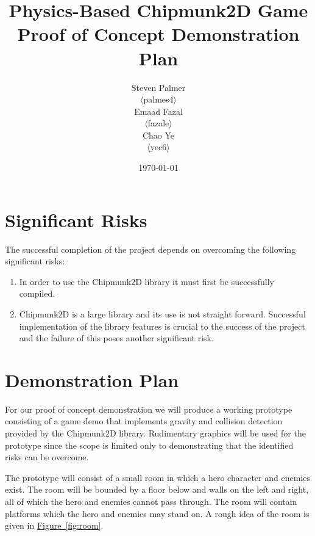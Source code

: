 \documentclass[12pt, titlepage]{article}
\begin{document}
\title{\bf Physics-Based Chipmunk2D Game\\[\baselineskip]\Large Proof of Concept Demonstration Plan}
\author{Steven Palmer\\$\langle$palmes4$\rangle$\\Emaad Fazal\\$\langle$fazale$\rangle$\\Chao Ye\\$\langle$yec6$\rangle$}
\date{\today}
	
\maketitle

\section*{Significant Risks}
The successful completion of the project depends on overcoming the following significant risks:
\begin{enumerate}
  \item In order to use the Chipmunk2D library it must first be successfully compiled.
  \item Chipmunk2D is a large library and its use is not straight forward.  Successful implementation of the library features is crucial to the success of the project and the failure of this poses another significant risk.
\end{enumerate}


\section*{Demonstration Plan}

For our proof of concept demonstration we will produce a working prototype consisting of a game demo that implements gravity and collision detection provided by the Chipmunk2D library.  Rudimentary graphics will be used for the prototype since the scope is limited only to demonstrating that the identified risks can be overcome.

The prototype will consist of a small room in which a hero character and enemies exist.  The room will be bounded by a floor below and walls on the left and right, all of which the hero and enemies cannot pass through.  The room will contain platforms which the hero and enemies may stand on.  A rough idea of the room is given in \hyperref[fig:room]{Figure~\ref*{fig:room}}.
\end{document}
